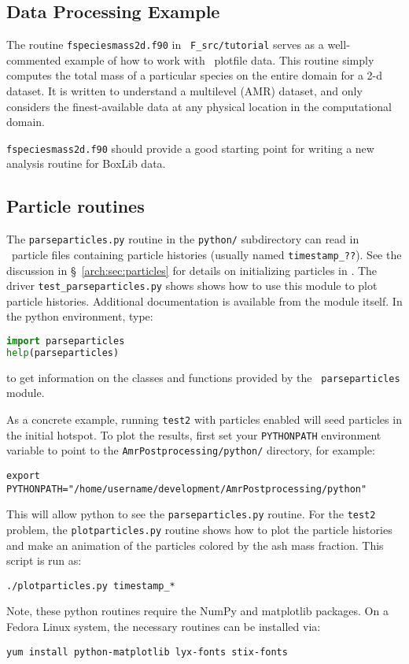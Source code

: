 \subsection{Data Processing Example}

The routine {\tt fspeciesmass2d.f90} in {\tt
  F\_src/tutorial} serves as a well-commented example of how
to work with \maestro\ plotfile data.  This routine simply computes
the total mass of a particular species on the entire domain for a 2-d
dataset.  It is written to understand a multilevel (AMR) dataset, and
only considers the finest-available data at any physical location in
the computational domain.

{\tt fspeciesmass2d.f90} should provide a good starting point for
writing a new analysis routine for BoxLib data.

\subsection{Particle routines}

\label{analysis:sec:particles}

The {\tt parseparticles.py} routine in the {\tt python/} subdirectory
can read in \maestro\ particle files containing particle histories
(usually named {\tt timestamp\_??}).  See the discussion in
\S~\ref{arch:sec:particles} for details on initializing particles in
\maestro.  The driver {\tt test\_parseparticles.py} shows shows how to
use this module to plot particle histories.  Additional documentation
is available from the module itself.  In the python environment,
type:
\begin{lstlisting}[language=Python]
import parseparticles
help(parseparticles)
\end{lstlisting}
to get information on the classes and functions provided by the {\tt
  parseparticles} module.

As a concrete example, running {\tt test2} with particles enabled
will seed particles in the initial hotspot.  To plot the results,
first set your {\tt PYTHONPATH} environment variable to point to the
{\tt AmrPostprocessing/python/} directory, for example:
\begin{verbatim}
export PYTHONPATH="/home/username/development/AmrPostprocessing/python"
\end{verbatim}
This will allow python to see the {\tt parseparticles.py} routine.
For the {\tt test2} problem, the {\tt plotparticles.py} routine shows
how to plot the particle histories and make an animation of the
particles colored by the ash mass fraction.  This script is run as:
\begin{verbatim}
./plotparticles.py timestamp_*
\end{verbatim}

Note, these python routines require the NumPy and matplotlib packages.
On a Fedora Linux system, the necessary routines can be installed via:
\begin{verbatim}
yum install python-matplotlib lyx-fonts stix-fonts
\end{verbatim}




